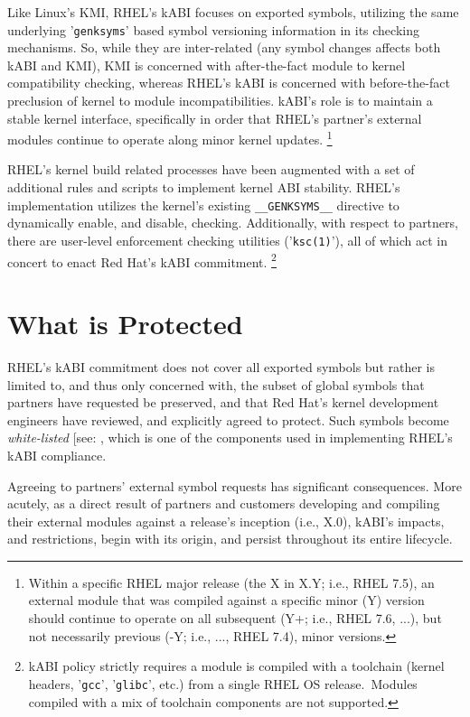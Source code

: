 \documentclass[10pt,oneside,english]{book}
\begin{document}
Like Linux's KMI, RHEL's kABI focuses on exported symbols, utilizing
the same underlying '\texttt{genksyms}' based symbol versioning information
in its checking mechanisms. So, while they are inter-related (any
symbol changes affects both kABI and KMI), KMI is concerned with after-the-fact
module to kernel compatibility checking, whereas RHEL's kABI is concerned
with before-the-fact preclusion of kernel to module incompatibilities.
kABI's role is to maintain a stable kernel interface, specifically
in order that RHEL's partner's external modules continue to operate
along minor kernel updates. \footnote{\label{fn:c3f1}Within a specific RHEL major release (the X in X.Y;
i.e., RHEL 7.5), an external module that was compiled against a specific
minor (Y) version should continue to operate on all subsequent (Y+;
i.e., RHEL 7.6, ...), but not necessarily previous (-Y; i.e., ...,
RHEL 7.4), minor versions.}

RHEL's kernel build related processes have been augmented with a set
of additional rules and scripts to implement kernel ABI stability.
RHEL's implementation utilizes the kernel's existing \texttt{\_\_GENKSYMS\_\_}
directive to dynamically enable, and disable, checking. Additionally,
with respect to partners, there are user-level enforcement checking
utilities ('\texttt{ksc(1)}'), all of which act in concert to enact
Red Hat's kABI commitment. \footnote{kABI policy strictly requires a module is compiled with a toolchain
(kernel headers, '\texttt{gcc}', '\texttt{glibc}', etc.) from a single
RHEL OS release. Modules compiled with a mix of toolchain components
are not supported.}

\section{What is Protected}

RHEL's kABI commitment does not cover all exported symbols but rather
is limited to, and thus only concerned with, the subset of global
symbols that partners have requested be preserved, and that Red Hat's
kernel development engineers have reviewed, and explicitly agreed
to protect. Such symbols become \emph{white-listed }{[}see: \nameref{chap:kABI-Lists}{]},
which is one of the components used in implementing RHEL's kABI compliance.

Agreeing to partners' external symbol requests has significant consequences.
More acutely, as a direct result of partners and customers developing
and compiling their external modules against a release's inception
(i.e., X.0), kABI's impacts, and restrictions, begin with its origin,
and persist throughout its entire lifecycle.
\end{document}

